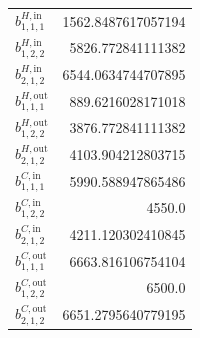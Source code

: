 \documentclass{article}%
\begin{document}
\begin{multicols*}{3}
\begin{supertabular}{lr}
	$b_{1,1,1}^{H,\text{in}}$ & 1562.8487617057194 \\%
	$b_{1,2,2}^{H,\text{in}}$ & 5826.772841111382 \\%
	$b_{2,1,2}^{H,\text{in}}$ & 6544.0634744707895 \\%
	$b_{1,1,1}^{H,\text{out}}$ & 889.6216028171018 \\%
	$b_{1,2,2}^{H,\text{out}}$ & 3876.772841111382 \\%
	$b_{2,1,2}^{H,\text{out}}$ & 4103.904212803715 \\%
	$b_{1,1,1}^{C,\text{in}}$ & 5990.588947865486 \\%
	$b_{1,2,2}^{C,\text{in}}$ & 4550.0 \\%
	$b_{2,1,2}^{C,\text{in}}$ & 4211.120302410845 \\%
	$b_{1,1,1}^{C,\text{out}}$ & 6663.816106754104 \\%
	$b_{1,2,2}^{C,\text{out}}$ & 6500.0 \\%
	$b_{2,1,2}^{C,\text{out}}$ & 6651.2795640779195 \\%
\end{supertabular}%
\end{multicols*}%
\clearpage%
\end{document}
